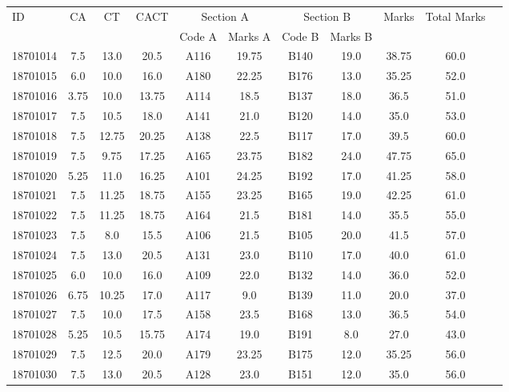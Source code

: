 \documentclass[12pt]{article}
\begin{document}
    \begin{center} 
	\renewcommand{\arraystretch}{1.08}
	\begin{small}
    \begin{tabular}{|l|c|c|c|c|c|c|c|c|c|c|} \hline
	\multirow{2}{*}{ID} & 	\multirow{2}{*}{CA}  & 	\multirow{2}{*}{CT}  & 	\multirow{2}{*}{CACT}  & \multicolumn{2 }{c|}{Section A}& \multicolumn{2 }{c|}{Section B} & 	\multirow{2}{*}{Marks}  & 	\multirow{2}{*}{Total Marks}  \\ 
	&  &  &  & Code A & Marks A & Code B & Marks B&  &  \\ \hline
18701014 & 7.5 & 13.0 & 20.5 & A116 & 19.75 & B140 & 19.0 & 38.75 & 60.0\\ \hline 
18701015 & 6.0 & 10.0 & 16.0 & A180 & 22.25 & B176 & 13.0 & 35.25 & 52.0\\ \hline 
18701016 & 3.75 & 10.0 & 13.75 & A114 & 18.5 & B137 & 18.0 & 36.5 & 51.0\\ \hline 
18701017 & 7.5 & 10.5 & 18.0 & A141 & 21.0 & B120 & 14.0 & 35.0 & 53.0\\ \hline 
18701018 & 7.5 & 12.75 & 20.25 & A138 & 22.5 & B117 & 17.0 & 39.5 & 60.0\\ \hline 
18701019 & 7.5 & 9.75 & 17.25 & A165 & 23.75 & B182 & 24.0 & 47.75 & 65.0\\ \hline 
18701020 & 5.25 & 11.0 & 16.25 & A101 & 24.25 & B192 & 17.0 & 41.25 & 58.0\\ \hline 
18701021 & 7.5 & 11.25 & 18.75 & A155 & 23.25 & B165 & 19.0 & 42.25 & 61.0\\ \hline 
18701022 & 7.5 & 11.25 & 18.75 & A164 & 21.5 & B181 & 14.0 & 35.5 & 55.0\\ \hline 
18701023 & 7.5 & 8.0 & 15.5 & A106 & 21.5 & B105 & 20.0 & 41.5 & 57.0\\ \hline 
18701024 & 7.5 & 13.0 & 20.5 & A131 & 23.0 & B110 & 17.0 & 40.0 & 61.0\\ \hline 
18701025 & 6.0 & 10.0 & 16.0 & A109 & 22.0 & B132 & 14.0 & 36.0 & 52.0\\ \hline 
18701026 & 6.75 & 10.25 & 17.0 & A117 & 9.0 & B139 & 11.0 & 20.0 & 37.0\\ \hline 
18701027 & 7.5 & 10.0 & 17.5 & A158 & 23.5 & B168 & 13.0 & 36.5 & 54.0\\ \hline 
18701028 & 5.25 & 10.5 & 15.75 & A174 & 19.0 & B191 & 8.0 & 27.0 & 43.0\\ \hline 
18701029 & 7.5 & 12.5 & 20.0 & A179 & 23.25 & B175 & 12.0 & 35.25 & 56.0\\ \hline 
18701030 & 7.5 & 13.0 & 20.5 & A128 & 23.0 & B151 & 12.0 & 35.0 & 56.0\\ \hline 

\end{tabular}
\end{small}
\end{center}
\end{document}
